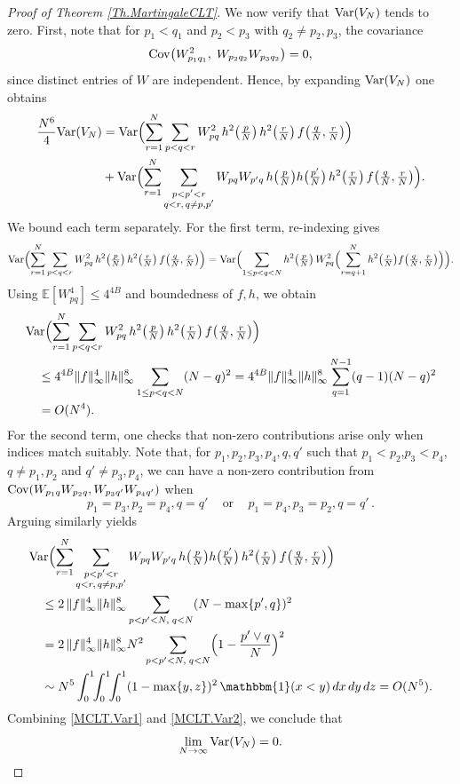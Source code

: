 \documentclass[11pt, reqno]{amsart}
\DeclareMathOperator{\one}{\mathbbm{1}} %
\numberwithin{equation}{section}
\DeclareMathOperator{\Var}{Var}
\newcommand{\E}{\mbox{${\mathbb E}$}}
\def\Var{{\rm Var}}
\def\Cov{{\rm Cov}}
\begin{document}
\begin{proof}[Proof of Theorem \ref{Th.MartingaleCLT}]
We now verify that $\Var(V_N)$ tends to zero. First, note that for $p_1<q_1$ and $p_2<p_3$ with $q_2\neq p_2,p_3$, the covariance
\[
\Cov\bigl(W_{p_1q_1}^2,\;W_{p_2q_2}W_{p_3q_2}\bigr) = 0,
\]
since distinct entries of $W$ are independent. Hence, by expanding $\Var(V_N)$ one obtains
\begin{align*}
\frac{N^6}{4}\Var(V_N)
&= \Var\Bigl(\sum_{r=1}^N \sum_{p<q<r} W_{pq}^2 \,h^2\bigl(\tfrac{p}{N}\bigr)\,h^2\bigl(\tfrac{r}{N}\bigr)\,f\bigl(\tfrac{q}{N},\tfrac{r}{N}\bigr)\Bigr)\\
&+ \Var\Bigl(\sum_{r=1}^N \sum_{\substack{p<p'<r\\ q<r,\,q\neq p,p'}} W_{pq}W_{p'q}\,h\bigl(\tfrac{p}{N}\bigr)h\bigl(\tfrac{p'}{N}\bigr)\,h^2\bigl(\tfrac{r}{N}\bigr)\,f\bigl(\tfrac{q}{N},\tfrac{r}{N}\bigr)\Bigr).
\end{align*}
We bound each term separately. For the first term, re-indexing gives
\[
\Var\Bigl(\sum_{r=1}^N\sum_{p<q<r} W_{pq}^2 \,h^2\bigl(\tfrac{p}{N}\bigr)\,h^2\bigl(\tfrac{r}{N}\bigr)\,f\bigl(\tfrac{q}{N},\tfrac{r}{N}\bigr)\Bigr)
= \Var\Bigl(\sum_{1\le p<q<N} h^2\bigl(\tfrac{p}{N}\bigr)\,W_{pq}^2\Bigl(\sum_{r=q+1}^N h^2\bigl(\tfrac{r}{N}\bigr)f\bigl(\tfrac{q}{N},\tfrac{r}{N}\bigr)\Bigr)\Bigr).
\]
Using $\E[W_{pq}^4]\le 4^{4B}$ and boundedness of $f,h$, we obtain
\begin{align}
&\Var\Bigl(\sum_{r=1}^N\sum_{p<q<r} W_{pq}^2 \,h^2\bigl(\tfrac{p}{N}\bigr)\,h^2\bigl(\tfrac{r}{N}\bigr)\,f\bigl(\tfrac{q}{N},\tfrac{r}{N}\bigr)\Bigr)\nonumber\\
&\quad\le 4^{4B}\|f\|_{\infty}^4\|h\|_{\infty}^8\sum_{1\le p<q<N}(N-q)^2
= 4^{4B}\|f\|_{\infty}^4\|h\|_{\infty}^8\sum_{q=1}^{N-1}(q-1)(N-q)^2\nonumber\\
&\quad= O(N^4).
\label{MCLT.Var1}
\end{align}
For the second term, one checks that non-zero contributions arise only when indices match suitably. Note that, for $p_1,p_2,p_3,p_4,q,q'$ such that $p_1<p_2$,$p_3 < p_4$, $q \ne p_1,p_2$ and $q' \ne p_3,p_4$, we can have a non-zero contribution from $\Cov(W_{p_1q}W_{p_2q},W_{p_3q'}W_{p_4q'})$ when 
\[
p_1 = p_3, p_2 = p_4, q= q'\, \quad \text{or}\, \quad p_1 = p_4, p_3=p_2 , q=q'\,.
\] Arguing similarly yields
\begin{align}
&\Var\Bigl(\sum_{r=1}^N \sum_{\substack{p<p'<r\\ q<r,\,q\neq p,p'}} W_{pq}W_{p'q}\,h\bigl(\tfrac{p}{N}\bigr)h\bigl(\tfrac{p'}{N}\bigr)\,h^2\bigl(\tfrac{r}{N}\bigr)\,f\bigl(\tfrac{q}{N},\tfrac{r}{N}\bigr)\Bigr)\nonumber\\
&\quad\le 2\,\|f\|_{\infty}^4\|h\|_{\infty}^8 \sum_{p<p'<N,\;q<N}(N-\max\{p',q\})^2\nonumber\\
&\quad= 2\,\|f\|_{\infty}^4\|h\|_{\infty}^8 N^2 \sum_{p<p'<N,\;q<N}\Bigl(1-\frac{p'\vee q}{N}\Bigr)^2\nonumber\\
&\quad\sim N^5 \int_0^1\!\!\int_0^1\!\!\int_0^1 (1-\max\{y,z\})^2\one(x<y)\,dx\,dy\,dz 
= O(N^5).
\label{MCLT.Var2}
\end{align}
Combining \eqref{MCLT.Var1} and \eqref{MCLT.Var2}, we conclude that
\[
\lim_{N\to\infty} \Var(V_N) = 0.
\]



\end{proof}
\end{document}

